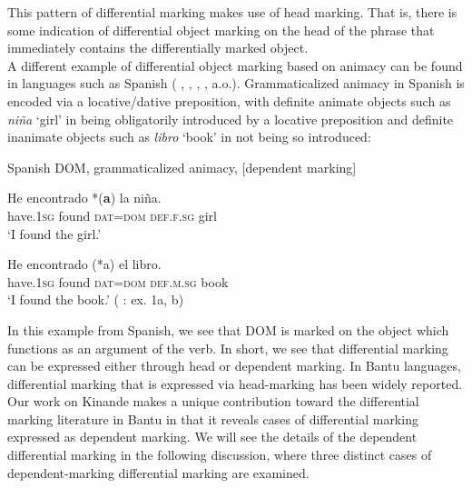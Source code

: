 \documentclass[output=paper]{langscibook}
\begin{document}
This pattern of differential marking makes use of head marking. That is, there is some indication of differential object marking on the head of the phrase that immediately contains the differentially marked object.\\
\indent A different example of differential object marking based on animacy can be found in languages such as Spanish (\citeauthor{boss91} \citeyear{boss91}, \citeauthor{Aissen2003} \citeyear{Aissen2003}, 
\citeauthor{Lopez2012} \citeyear{Lopez2012}, \citeauthor{OrmazabalRomero2013} \citeyear{OrmazabalRomero2013}, a.o.). Grammaticalized animacy in Spanish is encoded via a locative/dative preposition, with definite animate objects such as \textit{ni\~na} ‘girl’ in  being obligatorily introduced by a locative preposition and definite inanimate objects such as \textit{libro} ‘book’ in  not being so introduced:

\ea \label{ex:Spanish}
Spanish DOM, grammaticalized animacy, [dependent marking]

\begin{xlist}
\ex \label{ex:schneider:Spanishfirst}
\gll He 		encontrado   *(\textbf{a}) la    ni\~na.\\
have.\textsc{1sg} found \textsc{dat=dom} \textsc{def.f.sg} girl\\
\glt `I found the girl.' 

\ex \label{ex:schneider:Spanishsecond}
\gll He encontrado (*a) el libro.\\
have.\textsc{1sg} found \textsc{dat=dom} \textsc{def.m.sg} book\\
\glt `I found the book.' \hfill (\citeauthor{OrmazabalRomero2013} \citeyear{OrmazabalRomero2013}: ex. 1a, b)

\end{xlist}

\z

In this example from Spanish, we see that DOM is marked on the object which functions as an argument of the verb. In short, we see that differential marking can be expressed either through head or dependent marking. In Bantu languages, differential marking that is expressed via head-marking has been widely reported. Our work on Kinande makes a unique contribution toward the differential marking literature in Bantu in that it reveals cases of differential marking expressed as dependent marking. We will see the details of the dependent differential marking in the following discussion, where three distinct cases of dependent-marking differential marking are examined.   
\end{document}
